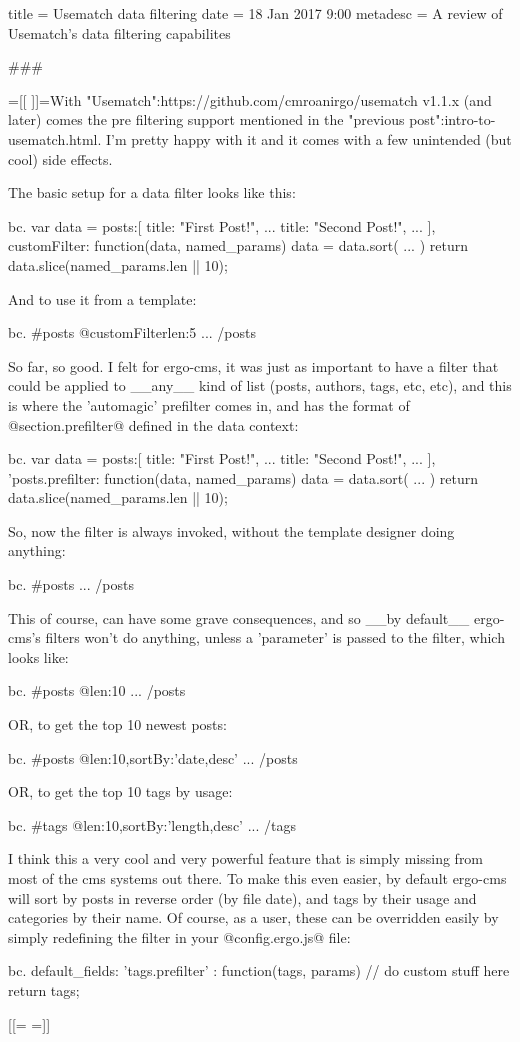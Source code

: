 title = Usematch data filtering
date = 18 Jan 2017 9:00
metadesc = A review of Usematch's data filtering capabilites

###

{{=[[ ]]=}}With "Usematch":https://github.com/cmroanirgo/usematch v1.1.x (and later) comes the pre filtering support mentioned in the "previous post":intro-to-usematch.html. I'm pretty happy with it and it comes with a few unintended (but cool) side effects.

The basic setup for a data filter looks like this:

bc. var data = {
	posts:[
		{ title: "First Post!", ...}
		{ title: "Second Post!", ...}
	],
	customFilter: function(data, named_params) {
		data = data.sort( ... )
		return data.slice(named_params.len || 10);
	}
}

And to use it from a template:

bc. {{#posts @customFilter{len:5} }} ... {{/posts}}

So far, so good. I felt for ergo-cms, it was just as important to have a filter that could be applied to __any__ kind of list (posts, authors, tags, etc, etc), and this is where the 'automagic' prefilter comes in, and has the format of @section.prefilter@ defined in the data context:

bc. var data = {
	posts:[
		{ title: "First Post!", ...}
		{ title: "Second Post!", ...}
	],
	'posts.prefilter: function(data, named_params) {
		data = data.sort( ... )
		return data.slice(named_params.len || 10);
	}
}

So, now the filter is always invoked, without the template designer doing anything:

bc. {{#posts}} ... {{/posts}}

This of course, can have some grave consequences, and so __by default__ ergo-cms's filters won't do anything, unless a 'parameter' is passed to the filter, which looks like:

bc. {{#posts @{len:10} }} ... {{/posts}}

OR, to get the top 10 newest posts:

bc. {{#posts @{len:10,sortBy:'date,desc'} }} ... {{/posts}}

OR, to get the top 10 tags by usage:

bc. {{#tags @{len:10,sortBy:'length,desc'} }} ... {{/tags}}

I think this a very cool and very powerful feature that is simply missing from most of the cms systems out there. To make this even easier, by default ergo-cms will sort by posts in reverse order (by file date), and tags by their usage and categories by their name. Of course, as a user, these can be overridden easily by simply redefining the filter in your @config.ergo.js@ file:


bc. default_fields: {
	'tags.prefilter' : function(tags, params) { 
		// do custom stuff here
		return tags;
	}
}



[[={{ }}=]]
